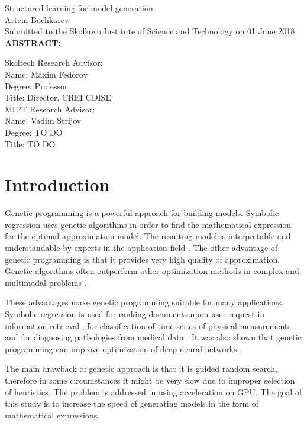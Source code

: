 \documentclass[12pt]{article}
\begin{document}
\clearpage

\setcounter{page}{3}
\begin{center}
	Structured learning for model generation\\
	Artem Bochkarev \\[5mm]
	Submitted to the Skolkovo Institute of Science and Technology
	on 01 June 2018 \\[5mm]
	\textbf{ABSTRACT:}
\end{center}

Skoltech Research Advisor: \\
Name: Maxim Fedorov \\
Degree: Professor \\
Title: Director, CREI CDISE \\[5mm]
MIPT Research Advisor: \\
Name: Vadim Strijov \\
Degree:{\color{red} TO DO} \\
Title: {\color{red} TO DO}

\newpage

\tableofcontents

\section{Introduction}
Genetic programming \cite{koza1992genetic} is a powerful approach for building models.
Symbolic regression \cite{zelinka2005analytic} uses genetic algorithms \cite{davis1991handbook} in order to find the mathematical expression for the optimal approximation model.
The resulting model is interpretable and understandable by experts in the application field \cite{johnson2000explanatory}.
The other advantage of genetic programming is that it provides very high quality of approximation. Genetic algorithms often outperform other optimization methods in complex and multimodal problems \cite{moles2003parameter}.

These advantages make genetic programming suitable for many applications.
Symbolic regression is used for ranking documents upon user request in information retrieval \cite{kulunchakov2017generation}, for classification of time series of physical measurements \cite{eads2002genetic} and for diagnosing pathologies from medical data \cite{tsakonas2004evolving}. It was also shown that genetic programming can improve optimization of deep neural networks \cite{david2014genetic}.

The main drawback of genetic approach is that it is guided random search, therefore in some circumstances it might be very slow due to improper selection of heuristics.
The problem is addressed in \cite{li2016accelerated} using acceleration on GPU.
The goal of this study is to increase the speed of generating models in the form of mathematical expressions.
\end{document}
